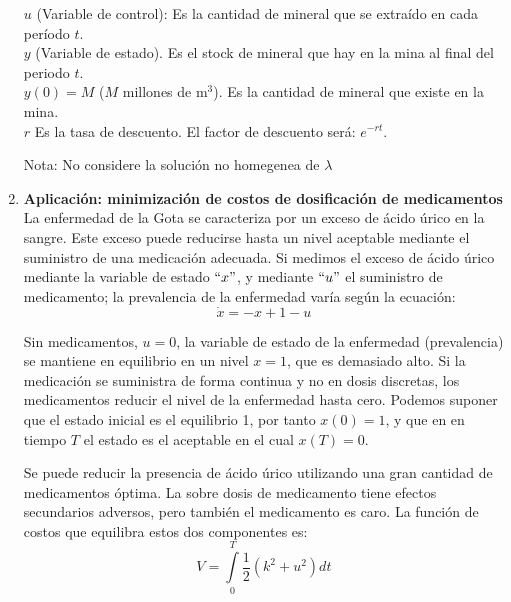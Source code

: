 \documentclass[10pt,a4paper]{article}
\begin{document}
\begin{enumerate}
		$u$ (Variable de control): Es la cantidad de mineral que se extraído en cada período $t$.\\
		$y$ (Variable de estado). Es el stock de mineral que hay en la mina al final del periodo $t$.\\
		$y(0) = M$ ($M$ millones de m$^3$). Es la cantidad de mineral que existe en la mina.\\
		$r$ Es la tasa de descuento. El factor de descuento será: $e^{-rt}$.\
		
		Nota: No considere la solución no homegenea de $\lambda$
		\item \textbf{Aplicación: minimización de costos de dosificación de medicamentos}\\
		La enfermedad de la Gota se caracteriza por un exceso de ácido úrico en la sangre. Este exceso puede reducirse hasta un nivel aceptable mediante el suministro de una medicación adecuada. Si medimos el exceso de ácido úrico mediante la variable de estado $``x"$, y mediante $``u"$ el suministro de medicamento; la prevalencia de la enfermedad varía según la ecuación: $$\dot{x}=-x+1-u$$
		
		Sin medicamentos, $u=0$, la variable de estado de la enfermedad (prevalencia) se mantiene en equilibrio en un nivel $x=1$, que es demasiado alto. Si la medicación se suministra de forma continua y no en dosis discretas, los medicamentos reducir el nivel de la enfermedad hasta cero. Podemos suponer que el estado inicial es el equilibrio 1, por tanto $x(0)=1$, y que en en tiempo $T$ el estado es el aceptable en el cual $x(T)=0$.\
		
		Se puede reducir la presencia de ácido úrico utilizando una gran cantidad de medicamentos óptima. La sobre dosis de medicamento tiene efectos secundarios adversos, pero también el medicamento es caro. La función de costos que equilibra estos dos componentes es: $$V=\int\limits_{0}^{T}\frac{1}{2}(k^2+u^2)dt$$
		

\end{enumerate}
\end{document}
